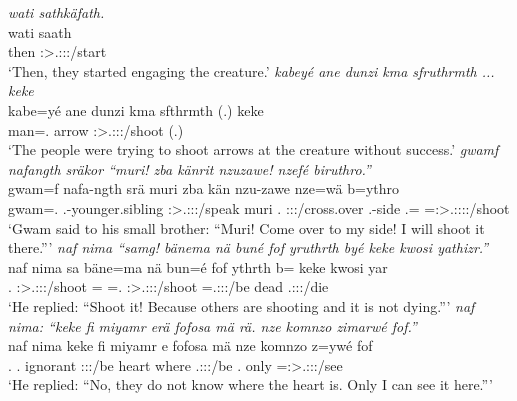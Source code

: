 \begin{exe}
\newpage 	
{} 
	\emph{wati sathkäfath.}\\
	\gll wati saath\\ 
	then \Stpl:\Sbj>\Tsg.\Masc:\Obj:\Pst:\Ipfv/start\\
	\trans `Then, they started engaging the creature.'
	\emph{kabeyé ane dunzi kma sfruthrmth ... keke}\\
	\gll kabe=yé ane dunzi kma sfthrmth (.) keke\\ 
	man=\Erg.{\Nsg} {\Dem} arrow {\Pot} \Stpl:\Sbj>\Tsg.\Masc:\Obj:\Pst:\Dur/shoot (.) \Neg\\
	\trans `The people were trying to shoot arrows at the creature without success.'
	\emph{gwamf nafangth sräkor ``muri! zba känrit nzuzawe! nzefé biruthro.''}\\
	\gll gwam=f nafa-ngth srä muri zba kän nzu-zawe nze=wä b=ythro\\ 
	gwam=\Erg.{\Sg} \Third.\Poss-younger.sibling \Stsg:\Sbj>\Tsg.\Masc:\Obj:\Irr:\Pfv/speak muri \Prox.{\Abl} \Ssg:\Sbj:\Imp:\Pfv/cross.over \Fsg.\Poss-side \Fsg.\Erg={\Emph} \Med=\Sg:\Sbj>\Tsg.\Masc:\Obj:\Nonpast:\Ipfv:\Andat/shoot\\
	\trans `Gwam said to his small brother: ``Muri! Come over to my side! I will shoot it there.'''
	\emph{naf nima ``samg! bänema nä buné fof yruthrth byé keke kwosi yathizr.''}\\
	\gll naf nima sa bäne=ma {nä bun=é} fof ythrth b= keke kwosi yar\\ 
	\Tsg.{\Erg} {\Quot} \Ssg:\Sbj>\Tsg.\Masc:\Obj:\Imp:\Pfv/shoot \Recog={\Char} \Indf=\Erg.{\Nsg} {\Emph} \Stpl:\Sbj>\Tsg.\Masc:\Obj:\Nonpast:\Ipfv/shoot \Med=\Tsg.\Masc:\Sbj:\Nonpast:\Ipfv/be {\Neg} dead \Tsg.\Masc:\Sbj:\Nonpast:\Ipfv/die\\
	\trans `He replied: ``Shoot it! Because others are shooting and it is not dying.'''
	\emph{naf nima: ``keke fi miyamr erä fofosa mä rä. nze komnzo zimarwé fof.''}\\
	\gll naf nima keke fi miyamr e fofosa mä  nze komnzo z=ywé fof\\ 
	\Tsg.{\Erg} {\Quot} {\Neg} \Third.{\Abs} ignorant \Stpl:\Sbj:\Nonpast:\Ipfv/be heart where \Tsg.\F:\Sbj:\Nonpast:\Ipfv/be \Fsg.{\Erg} only \Prox=\Fsg:\Sbj>\Tsg.\Masc:\Obj:\Nonpast:\Ipfv/see {\Emph}\\
	\trans `He replied: ``No, they do not know where the heart is. Only I can see it here.'''

\end{exe}
